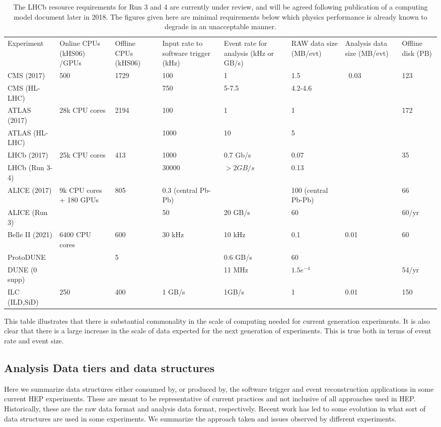 \begin{table}
\begin{tabular}{|l|l|l|l|l|l|l|l|}
Experiment &
Online CPUs (kHS06) /GPUs  &
Offline CPUs (kHS06) &
Input rate to software trigger (kHz) &
Event rate for analysis (kHz or GB/s) &
RAW data size (MB/evt) &
Analysis data size (MB/evt) &
Offline disk (PB) \\
CMS (2017) &
500&
1729&
100&
1&
1.5&
~0.03&
123 \\
CMS (HL-LHC) &
&
&
750&
5-7.5&
4.2-4.6&
&
\\
ATLAS (2017) &
28k CPU cores&
2194&
100&
1&
1&
&
172\\
ATLAS (HL-LHC) &
&
&
1000&
10&
5&
&
\\
LHCb (2017)&
25k CPU cores&
413&
1000&
0.7 Gb/s&
0.07&
&
35\\
LHCb (Run 3-4) &
&
&
30000&
$>2 GB/s$&
0.13&
&
\\
ALICE (2017) &
9k CPU cores + 180 GPUs &
805&
0.3 (central Pb-Pb)&
&
100 (central Pb-Pb) &
&
66 \\
ALICE (Run 3) &
&
&
50&
20 GB/s&
60&
&
60/yr \\
Belle II (2021) &
6400 CPU cores&
600&
30 kHz&
10 kHz&
0.1&
0.01&
60\\
ProtoDUNE&
&
5&
&
0.6 GB/s&
60&
&
\\
DUNE (0 supp)&
&
&
&
11 MHz&
$1.5e^{-4}$&
&
54/yr \\
ILC (ILD,SiD)&
250&
400&
1 GB/s&
1GB/s&
1&
0.01&
150 \\
\end{tabular}
\caption{The LHCb resource requirements for Run 3 and 4 are currently under review, and will be agreed following publication of a computing model document later in 2018. The figures given here are minimal requirements below which physics performance is already known to degrade in an unacceptable manner.}
\end{table}

This table illustrates that there is substantial commonality in the scale of computing needed for current generation experiments. It is also clear that there is a large increase in the scale of data expected for the next generation of experiments. This is true both in terms of event rate and event size.

\subsection{Analysis Data tiers and data structures}
Here we summarize data structures either consumed by, or produced by, the software trigger and event reconstruction applications in some current HEP experiments. These are meant to be representative of current practices and not inclusive of all approaches used in HEP. Historically, these are the raw data format and analysis data format, respectively. Recent work has led to some evolution in what sort of data structures are used in some experiments. We summarize the approach taken and issues observed by different experiments.

